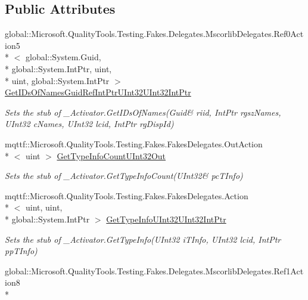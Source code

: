 \subsection*{Public Attributes}
\begin{DoxyCompactItemize}
\item 
global\-::\-Microsoft.\-Quality\-Tools.\-Testing.\-Fakes.\-Delegates.\-Mscorlib\-Delegates.\-Ref0\-Action5\\*
$<$ global\-::\-System.\-Guid, \\*
global\-::\-System.\-Int\-Ptr, uint, \\*
uint, global\-::\-System.\-Int\-Ptr $>$ \hyperlink{class_system_1_1_runtime_1_1_interop_services_1_1_fakes_1_1_stub___activator_a32be38ad494ca50d2932cd23c84dc5d1}{Get\-I\-Ds\-Of\-Names\-Guid\-Ref\-Int\-Ptr\-U\-Int32\-U\-Int32\-Int\-Ptr}
\begin{DoxyCompactList}\small\item\em Sets the stub of \-\_\-\-Activator.\-Get\-I\-Ds\-Of\-Names(Guid\& riid, Int\-Ptr rgsz\-Names, U\-Int32 c\-Names, U\-Int32 lcid, Int\-Ptr rg\-Disp\-Id)\end{DoxyCompactList}\item 
mqttf\-::\-Microsoft.\-Quality\-Tools.\-Testing.\-Fakes.\-Fakes\-Delegates.\-Out\-Action\\*
$<$ uint $>$ \hyperlink{class_system_1_1_runtime_1_1_interop_services_1_1_fakes_1_1_stub___activator_ab72cb6a15d0f65766478978c6e4ff67b}{Get\-Type\-Info\-Count\-U\-Int32\-Out}
\begin{DoxyCompactList}\small\item\em Sets the stub of \-\_\-\-Activator.\-Get\-Type\-Info\-Count(U\-Int32\& pc\-T\-Info)\end{DoxyCompactList}\item 
mqttf\-::\-Microsoft.\-Quality\-Tools.\-Testing.\-Fakes.\-Fakes\-Delegates.\-Action\\*
$<$ uint, uint, \\*
global\-::\-System.\-Int\-Ptr $>$ \hyperlink{class_system_1_1_runtime_1_1_interop_services_1_1_fakes_1_1_stub___activator_a4ed21a0536bbbda1b6e984c9da1380a1}{Get\-Type\-Info\-U\-Int32\-U\-Int32\-Int\-Ptr}
\begin{DoxyCompactList}\small\item\em Sets the stub of \-\_\-\-Activator.\-Get\-Type\-Info(\-U\-Int32 i\-T\-Info, U\-Int32 lcid, Int\-Ptr pp\-T\-Info)\end{DoxyCompactList}\item 
global\-::\-Microsoft.\-Quality\-Tools.\-Testing.\-Fakes.\-Delegates.\-Mscorlib\-Delegates.\-Ref1\-Action8\\*

\end{DoxyCompactItemize}
